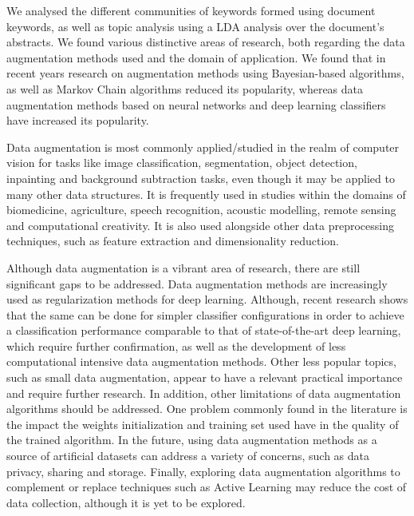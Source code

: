 \documentclass[parskip=full]{scrartcl}
\begin{document}
We analysed the different communities of keywords formed using document
keywords, as well as topic analysis using a LDA analysis over the document's
abstracts. We found various distinctive areas of research, both regarding the
data augmentation methods used and the domain of application. We found that in
recent years research on augmentation methods using Bayesian-based algorithms,
as well as Markov Chain algorithms reduced its popularity, whereas data
augmentation methods based on neural networks and deep learning classifiers
have increased its popularity.

Data augmentation is most commonly applied/studied in the realm of computer
vision for tasks like image classification, segmentation, object detection,
inpainting and background subtraction tasks, even though it may be applied to
many other data structures. It is frequently used in studies within the
domains of biomedicine, agriculture, speech recognition, acoustic modelling,
remote sensing and computational creativity. It is also used alongside other
data preprocessing techniques, such as feature extraction and dimensionality
reduction.

Although data augmentation is a vibrant area of research, there are still
significant gaps to be addressed. Data augmentation methods are increasingly
used as regularization methods for deep learning. Although, recent research
shows that the same can be done for simpler classifier configurations in order
to achieve a classification performance comparable to that of state-of-the-art
deep learning, which require further confirmation, as well as the development
of less computational intensive data augmentation methods. Other less popular
topics, such as small data augmentation, appear to have a relevant practical
importance and require further research. In addition, other limitations of
data augmentation algorithms should be addressed. One problem commonly found
in the literature is the impact the weights initialization and training set
used have in the quality of the trained algorithm. In the future, using data
augmentation methods as a source of artificial datasets can address a variety
of concerns, such as data privacy, sharing and storage. Finally, exploring
data augmentation algorithms to complement or replace techniques such as
Active Learning may reduce the cost of data collection, although it is yet to
be explored.



\end{document}
